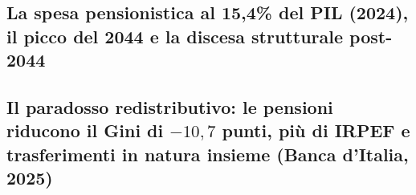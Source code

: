     \subsection{La spesa pensionistica al 15,4\% del PIL (2024),
                il picco del 2044 e la discesa strutturale post-2044}
    \subsection{Il paradosso redistributivo:
                le pensioni riducono il Gini di $-10{,}7$ punti,
                più di IRPEF e trasferimenti in natura insieme
                (Banca d'Italia, 2025)}

